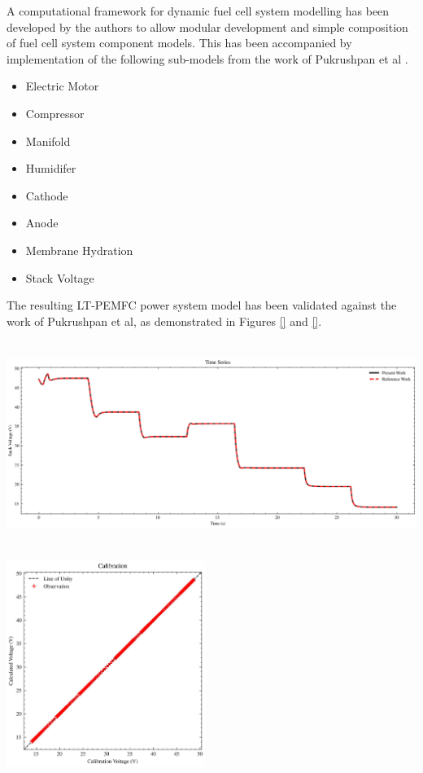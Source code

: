 A computational framework for dynamic fuel cell system modelling has been developed by the authors to allow modular development and simple composition of fuel cell system component models. This has been accompanied by implementation of the following sub-models from the work of Pukrushpan et al \cite{pukrushpan_control_2004}.
\begin{multicols}{2}
	\begin{itemize}
		\item Electric Motor
		\item Compressor
		\item Manifold
		\item Humidifer
		\item Cathode
		\item Anode
		\item Membrane Hydration
		\item Stack Voltage
	\end{itemize}
\end{multicols}
\vspace{-1em}
The resulting LT-PEMFC power system model has been validated against the work of Pukrushpan et al, as demonstrated in Figures \ref{} and \ref{}.

\noindent
\begin{minipage}[t]{\linewidth}
	\begin{center}
		\includegraphics[height=18em]{figures/voltage_ts.jpg}
	\end{center}
\end{minipage}%
\hfill\vspace{1em}
\begin{minipage}[t]{\linewidth}
	\begin{center}
		\includegraphics[height=18em]{figures/voltage_cal.jpg}
	\end{center}
\end{minipage}

